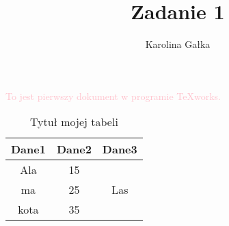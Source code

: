 \documentclass{article}
\title{Zadanie 1}
\author{Karolina Gałka}
\date{}
\begin{document}
\maketitle
{}
\textcolor{pink}{To jest pierwszy dokument w programie TeXworks.}

\begin{table}[ht]

	\caption{Tytuł mojej tabeli } 
	\centering 
	\color{green}\begin{tabular}{|c|c|c|} 
	\hline 
	Dane1 & Dane2& Dane3 \\ 
	 \hline 
	Ala & 15 & \\
	ma &25 & Las \\
	kota & 35 &   \\
\hline 
\end{tabular}
\end{table}

\end{document}
